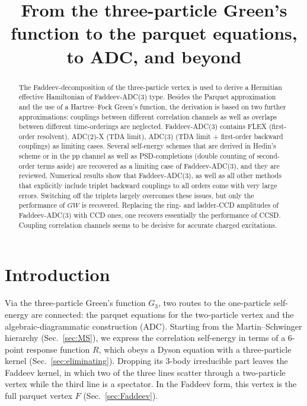 \documentclass[aip,jcp,reprint,noshowkeys,superscriptaddress]{revtex4-1}
\newcommand{\pp}{\text{pp}}
\begin{document}
\title{From the three-particle Green's function to the parquet equations,
to ADC, and beyond}

\begin{abstract}
The Faddeev-decomposition of the three-particle vertex is used to derive a 
Hermitian effective Hamiltonian of Faddeev-ADC(3) type. Besides the Parquet approximation and the use of
a Hartree--Fock Green's function, the derivation is based on 
two further approximations: couplings between different correlation channels as well as overlaps between different time-orderings
are neglected. Faddeev-ADC(3) contains FLEX (first-order resolvent), ADC(2)-X (TDA limit), ADC(3) (TDA limit + first-order backward couplings)
as limiting cases. Several self-energy schemes that are derived in Hedin's scheme 
or in the $\pp$ channel as well as PSD-completions (double counting of second-order terms aside)
are recovered as a limiting 
case of Faddeev-ADC(3), and they are reviewed. Numerical results show that 
Faddeev-ADC(3), as well as all other methods that explicitly include 
triplet backward couplings to all orders come with very large errors. Switching off 
the triplets largely overcomes these issues, but only the performance of $GW$ is recovered.
Replacing the ring- and ladder-CCD amplitudes of Faddeev-ADC(3) with CCD ones,
one recovers essentially the performance of 
CCSD. Coupling correlation channels seems to be decisive for accurate charged excitations.
\end{abstract}


\maketitle
\tableofcontents

\section{Introduction}
\label{sec:introduction}
Via the three-particle Green's function $G_3$,
two routes to the one-particle self-energy are connected: the
parquet equations for the two-particle vertex and the
algebraic-diagrammatic construction (ADC).
Starting from the Martin--Schwinger hierarchy (Sec.~\ref{sec:MS}), we
express the correlation self-energy in terms of a 6-point response
function $R$, which obeys a Dyson equation with a three-particle kernel
(Sec.~\ref{sec:eliminating}). Dropping its 3-body irreducible part
leaves the Faddeev kernel,\cite{Faddeev1961,Winter1972,Ethofer1969} in
which two of the three lines scatter through a two-particle vertex
while the third line is a spectator. In the Faddeev form, this vertex
is the full parquet vertex $F$ (Sec.~\ref{sec:Faddeev}).\cite{Kugler2018}
\end{document}
